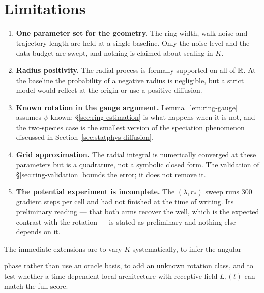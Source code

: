 \section{Limitations}\label{sec:ring-limits}

\begin{enumerate}
  \item \textbf{One parameter set for the geometry.} The ring width, walk noise
  and trajectory length are held at a single baseline. Only the noise level and
  the data budget are swept, and nothing is claimed about scaling in $K$.
  \item \textbf{Radius positivity.} The radial process is formally supported on
  all of $\mathbb{R}$. At the baseline the probability of a negative radius is
  negligible, but a strict model would reflect at the origin or use a positive
  diffusion.
  \item \textbf{Known rotation in the gauge argument.}
  Lemma~\ref{lem:ring-gauge} assumes $\psi$ known; \S\ref{sec:ring-estimation}
  is what happens when it is not, and the two-species case is the smallest
  version of the speciation phenomenon discussed in
  Section~\ref{sec:statphys-diffusion}.
  \item \textbf{Grid approximation.} The radial integral is numerically
  converged at these parameters but is a quadrature, not a symbolic closed
  form. The validation of \S\ref{sec:ring-validation} bounds the error; it does
  not remove it.
  \item \textbf{The potential experiment is incomplete.} The $(\lambda,r_*)$
  sweep runs 300 gradient steps per cell and had not finished at the time of
  writing. Its preliminary reading --- that both arms recover the well, which
  is the expected contrast with the rotation --- is stated as preliminary and
  nothing else depends on it.
\end{enumerate}

The immediate extensions are to vary $K$ systematically, to infer the angular

phase rather than use an oracle basis, to add an unknown rotation class, and to
test whether a time-dependent local architecture with receptive field
$L_\epsilon(t)$ can match the full score.
